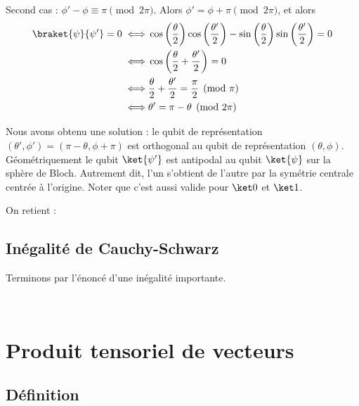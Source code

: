\documentclass[11pt,class=report,crop=false]{standalone}
\begin{document}
Second cas : $\phi'-\phi \equiv \pi \pmod{2\pi}$. Alors $\phi'=\phi+\pi \pmod{2\pi}$, et alors 
\begin{align*}
\braket{\psi}{\psi'} = 0 
\iff& \cos\left(\frac\theta2\right)\cos\left(\frac{\theta'}2\right)
- \sin\left(\frac\theta2\right)\sin\left(\frac{\theta'}2\right) = 0 \\
\iff& \cos\left(\frac\theta2+\frac{\theta'}2\right) = 0 \\
\iff& \frac\theta2+\frac{\theta'}2 = \frac\pi2 \pmod{\pi} \\
\iff& \theta' = \pi - \theta \pmod{2\pi} \\
\end{align*}

Nous avons obtenu une solution : le qubit de représentation $(\theta',\phi') = (\pi-\theta,\phi+\pi)$ est orthogonal au qubit de représentation $(\theta,\phi)$.
Géométriquement le qubit $\ket{\psi'}$ est antipodal au qubit $\ket{\psi}$ sur la sphère de Bloch. Autrement dit, l'un s'obtient de l'autre par la symétrie centrale centrée à l'origine.
Noter que c'est aussi valide pour $\ket0$ et $\ket1$.

On retient :



\subsection{Inégalité de Cauchy-Schwarz}

Terminons par l'énoncé d'une inégalité importante. 
\begin{theoreme}
~
\end{theoreme}



\section{Produit tensoriel de vecteurs}

\subsection{Définition}
\end{document}
